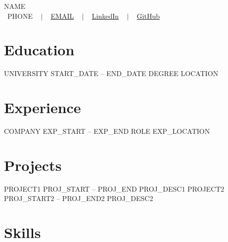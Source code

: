 \renewcommand{\labelitemii}{$\circ$}
\newcommand{\resumeSubHeadingListStart}{\begin{itemize}[leftmargin=*]}
\newcommand{\resumeSubHeadingListEnd}{\end{itemize}}
\newcommand{\resumeItemListStart}{\begin{itemize}}
\newcommand{\resumeItemListEnd}{\end{itemize}}



\begin{center}
    {\Huge \scshape {{NAME}}} \\ \vspace{1pt}
    \faPhone\ {{PHONE}} ~ $|$ ~
    \href{mailto:{{EMAIL}}}{{EMAIL}} ~ $|$ ~
    \href{https://linkedin.com/in/{{LINKEDIN}}}{LinkedIn} ~ $|$ ~
    \href{https://github.com/{{GITHUB}}}{GitHub}
\end{center}


\section{Education}
  \resumeSubHeadingListStart
    \resumeSubheading
      {{UNIVERSITY}} { {{START_DATE}} -- {{END_DATE}} }
      { {{DEGREE}} }{ {{LOCATION}} }
  \resumeSubHeadingListEnd


\section{Experience}
  \resumeSubHeadingListStart
    \resumeSubheading
      {{COMPANY}} { {{EXP_START}} -- {{EXP_END}} }
      { {{ROLE}} }{ {{EXP_LOCATION}} }
      \resumeItemListStart
      \resumeItemListEnd
  \resumeSubHeadingListEnd


\section{Projects}
  \resumeSubHeadingListStart
    \resumeProject
      {{PROJECT1}} { {{PROJ_START}} -- {{PROJ_END}} }
      { {{PROJ_DESC1}} }
    \resumeProject
      {{PROJECT2}} { {{PROJ_START2}} -- {{PROJ_END2}} }
      { {{PROJ_DESC2}} }
  \resumeSubHeadingListEnd


\section{Skills}
  \resumeItemListStart
  \resumeItemListEnd



